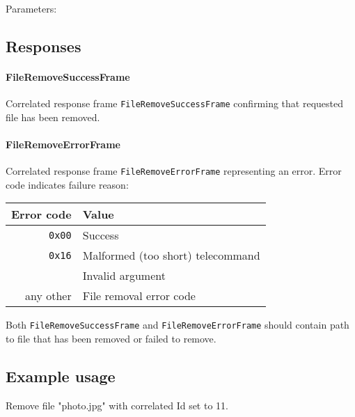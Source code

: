 Parameters: 

\begin{tcarglist}
\end{tcarglist}

\subsection{Responses}
\paragraph{FileRemoveSuccessFrame}
Correlated response frame \texttt{FileRemoveSuccessFrame} confirming that requested file has been removed.

\paragraph{FileRemoveErrorFrame}
Correlated response frame \texttt{FileRemoveErrorFrame} representing an error. Error code indicates failure reason:

\begin{tabular}{r | l}
    Error code & Value \\
    \hline
    \texttt{0x00}   & Success \\
    \texttt{0x16}   & Malformed (too short) telecommand \\
                    & Invalid argument \\
    any other & File removal error code \\
\end{tabular}

Both \texttt{FileRemoveSuccessFrame} and \texttt{FileRemoveErrorFrame} should contain path to file that 
has been removed or failed to remove.


\subsection{Example usage}
Remove file "photo.jpg" with correlated Id set to 11.


